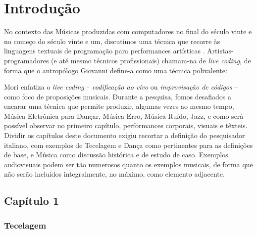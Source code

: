 \chapter*{Introdução}\label{cap:intro}

No contexto das Músicas produzidas com computadores no final do século vinte e no começo do século vinte e um, discutimos uma técnica que recorre às linguagens textuais de programação para performances artísticas \cite{McLean2011}. Artistas-programadores (e até mesmo técnicos profissionais) chamam-na de \emph{live coding}, de forma que o antropólogo Giovanni  define-a como uma técnica polivalente:


Mori enfatiza o \emph{live coding} -- \emph{codificação ao vivo} ou \emph{improvisação de códigos} -- como foco de proposições musicais. Durante a pesquisa, fomos desafiados a encarar uma técnica que permite produzir, algumas vezes ao mesmo tempo, Música Eletrônica para Dançar, Música-Erro, Música-Ruído, Jazz, e como será possível observar no primeiro capítulo, performances corporais, visuais e têxteis. Dividir os capítulos deste documento exigiu recortar a definição do pesquisador italiano, com exemplos de Tecelagem e Dança como pertinentes para as definições de base, e Música como discussão histórica e de estudo de caso. Exemplos audiovisuais podem ser tão numerosos quanto os exemplos musicais, de forma que não serão incluídos integralmente, no máximo, como elemento adjacente.

\section*{Capítulo 1}

\subsection*{Tecelagem}

